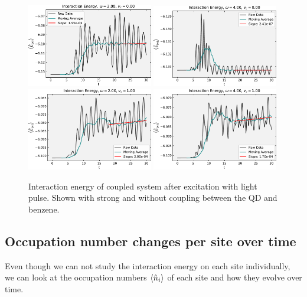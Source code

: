 \begin{figure}[!hbt]
    \centering
    \includegraphics[width=0.49\textwidth]{graph/potential_energy/Epot_w2_vc0.pdf}
    \includegraphics[width=0.49\textwidth]{graph/potential_energy/Epot_w4_vc0.pdf}
    \includegraphics[width=0.49\textwidth]{graph/potential_energy/Epot_w2_vc1.pdf}
    \includegraphics[width=0.49\textwidth]{graph/potential_energy/Epot_w4_vc1.pdf}
    \caption{Interaction energy of coupled system after excitation with light pulse. Shown with strong and without coupling between the QD and benzene.}
    \label{fig:interaction_energy_omega}
\end{figure}

\subsection{Occupation number changes per site over time}
Even though we can not study the interaction energy on each site individually, we can look at the occupation numbers $\braket{\hat{n}_i}$ of each site and how they evolve over time.
\medskip

